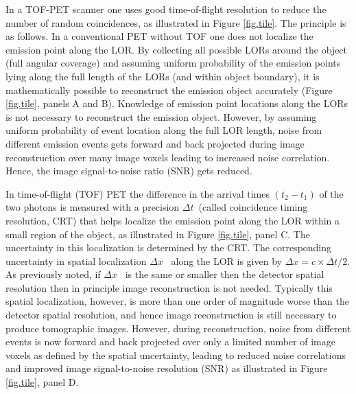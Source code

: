 In a TOF-PET scanner one uses good time-of-flight resolution to reduce the number of random coincidences, as illustrated in Figure \ref{fig.tile}. The principle is as follows. In a conventional PET without TOF one does not localize the emission point along the LOR. By collecting all possible LORs around the object (full angular coverage) and assuming uniform probability of the emission points lying along the full length of the LORs (and within object boundary), it is mathematically possible to reconstruct the emission object accurately (Figure \ref{fig.tile}, panels A and B). Knowledge of emission point locations along the LORs is not necessary to reconstruct the emission object. However, by assuming uniform probability of event location along the full LOR length, noise from different emission events gets forward and back projected during image reconstruction over many image voxels leading to increased noise correlation. Hence, the image signal-to-noise ratio (SNR) gets reduced.

In time-of-flight (TOF) PET the difference in the arrival times $(t_2 - t_1)$ of the two photons is measured with a precision $\Delta t$~(called coincidence timing resolution, CRT) that helps localize the emission point along the LOR within a small region of the object, as illustrated in  Figure \ref{fig.tile}, panel C. The uncertainty in this localization is determined by the CRT. The corresponding uncertainty in spatial localization $\Delta x$~ along the LOR is given by 
$\Delta x=c \times \Delta t/2$. As previously noted, if $\Delta x$~ is the same or smaller then the detector spatial resolution then in principle image reconstruction is not needed. Typically this spatial localization, however, is more than one order of magnitude worse than the detector spatial resolution, and hence image reconstruction is still necessary to produce tomographic images. However, during reconstruction, noise from different events is now forward and back projected over only a limited number of image voxels as defined by the spatial uncertainty, leading to reduced noise correlations and improved image signal-to-noise resolution (SNR) as illustrated in  Figure \ref{fig.tile}, panel D.


